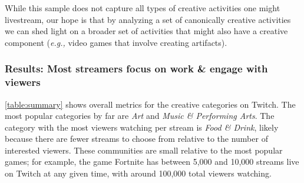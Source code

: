 While this sample does not capture all types of creative activities one might livestream, our hope is that by analyzing a set of canonically creative activities we can shed light on a broader set of activities that might also have a creative component (\textit{e.g., } video games that involve creating artifacts).

\subsubsection{Results: Most streamers focus on work \& engage with viewers}
\autoref{table:summary} shows overall metrics for the creative categories on Twitch. The most popular categories by far are \textit{Art} and \textit{Music \& Performing Arts}. The category with the most viewers watching per stream is \textit{Food \& Drink}, likely because there are fewer streams to choose from relative to the number of interested viewers. These communities are small relative to the most popular games; for example, the game Fortnite has between 5,000 and 10,000 streams live on Twitch at any given time, with around 100,000 total viewers watching. %

